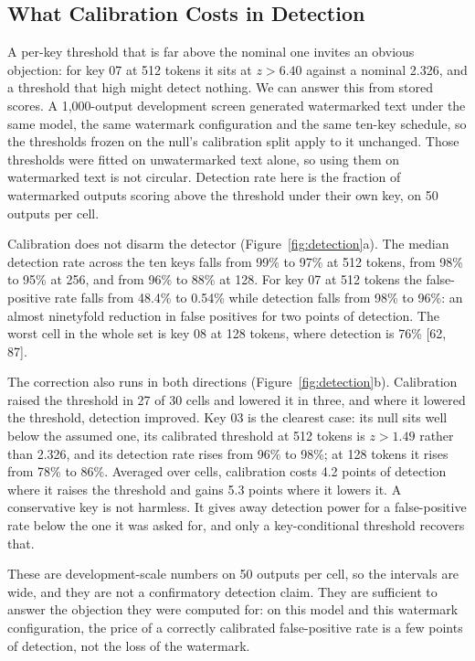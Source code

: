 \documentclass[conference]{IEEEtran}
\begin{document}
\subsection{What Calibration Costs in Detection}
\label{sec:c4b}

A per-key threshold that is far above the nominal one invites an obvious
objection: for key 07 at 512 tokens it sits at $z>6.40$ against a nominal
2.326, and a threshold that high might detect nothing. We can answer this from
stored scores. A 1{,}000-output development screen generated watermarked text
under the same model, the same watermark configuration and the same ten-key
schedule, so the thresholds frozen on the null's calibration split apply to it
unchanged. Those thresholds were fitted on unwatermarked text alone, so using
them on watermarked text is not circular. Detection rate here is the fraction of
watermarked outputs scoring above the threshold under their own key, on 50
outputs per cell.

Calibration does not disarm the detector (Figure~\ref{fig:detection}a). The
median detection rate across the ten keys falls from 99\% to 97\% at 512 tokens,
from 98\% to 95\% at 256, and from 96\% to 88\% at 128. For key 07 at 512 tokens
the false-positive rate falls from 48.4\% to 0.54\% while detection falls from
98\% to 96\%: an almost ninetyfold reduction in false positives for two points of
detection. The worst cell in the whole set is key 08 at 128 tokens, where
detection is 76\% [62, 87].

The correction also runs in both directions (Figure~\ref{fig:detection}b).
Calibration raised the threshold in 27 of 30 cells and lowered it in three, and
where it lowered the threshold, detection improved. Key 03 is the clearest case:
its null sits well below the assumed one, its calibrated threshold at 512 tokens
is $z>1.49$ rather than 2.326, and its detection rate rises from 96\% to 98\%; at
128 tokens it rises from 78\% to 86\%. Averaged over cells, calibration costs 4.2
points of detection where it raises the threshold and gains 5.3 points where it
lowers it. A conservative key is not harmless. It gives away detection power for
a false-positive rate below the one it was asked for, and only a key-conditional
threshold recovers that.

These are development-scale numbers on 50 outputs per cell, so the intervals are
wide, and they are not a confirmatory detection claim. They are sufficient to
answer the objection they were computed for: on this model and this watermark
configuration, the price of a correctly calibrated false-positive rate is a few
points of detection, not the loss of the watermark.
\end{document}

